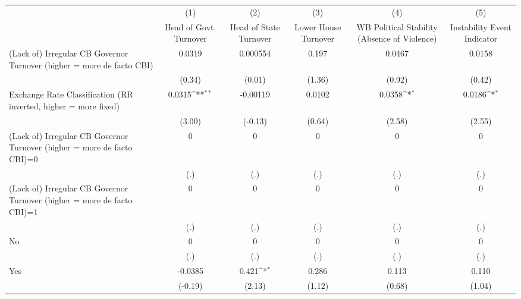 {
\def\sym#1{\ifmmode^{#1}\else\(^{#1}\)\fi}
\begin{tabular}{l*{5}{c}}
\hline\hline
                &\multicolumn{1}{c}{(1)}&\multicolumn{1}{c}{(2)}&\multicolumn{1}{c}{(3)}&\multicolumn{1}{c}{(4)}&\multicolumn{1}{c}{(5)}\\
                &\multicolumn{1}{c}{Head of Govt. Turnover}&\multicolumn{1}{c}{Head of State Turnover}&\multicolumn{1}{c}{Lower House Turnover}&\multicolumn{1}{c}{WB Political Stability (Absence of Violence)}&\multicolumn{1}{c}{Instability Event Indicator}\\
\hline
(Lack of) Irregular CB Governor Turnover (higher = more de facto CBI)&   0.0319         & 0.000554         &    0.197         &   0.0467         &   0.0158         \\
                &   (0.34)         &   (0.01)         &   (1.36)         &   (0.92)         &   (0.42)         \\
[1em]
Exchange Rate Classification (RR inverted, higher = more fixed)&   0.0315\sym{**} & -0.00119         &   0.0102         &   0.0358\sym{*}  &   0.0186\sym{*}  \\
                &   (3.00)         &  (-0.13)         &   (0.64)         &   (2.58)         &   (2.55)         \\
[1em]
(Lack of) Irregular CB Governor Turnover (higher = more de facto CBI)=0&        0         &        0         &        0         &        0         &        0         \\
                &      (.)         &      (.)         &      (.)         &      (.)         &      (.)         \\
[1em]
(Lack of) Irregular CB Governor Turnover (higher = more de facto CBI)=1&        0         &        0         &        0         &        0         &        0         \\
                &      (.)         &      (.)         &      (.)         &      (.)         &      (.)         \\
[1em]
No              &        0         &        0         &        0         &        0         &        0         \\
                &      (.)         &      (.)         &      (.)         &      (.)         &      (.)         \\
[1em]
Yes             &  -0.0385         &    0.421\sym{*}  &    0.286         &    0.113         &    0.110         \\
                &  (-0.19)         &   (2.13)         &   (1.12)         &   (0.68)         &   (1.04)         \\

\end{tabular}}

